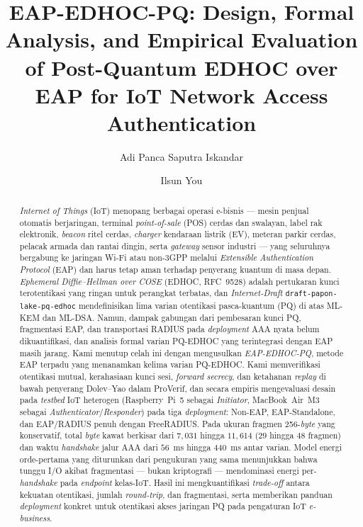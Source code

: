 \documentclass{easychair}
\title{EAP-EDHOC-PQ: Design, Formal Analysis, and Empirical Evaluation of Post-Quantum EDHOC over EAP for IoT Network Access Authentication}
\author{
Adi Panca Saputra Iskandar\inst{1,2}
\and
Ilsun You\inst{2}
}
\institute{
Kookmin University, Seoul, Korea\\
\email{adipancaiskandar@gmail.com, ilsunu@gmail.com}
\and
Udayana University, Bali, Indonesia\\
}
\begin{document}
\maketitle

\begin{abstract}
\emph{Internet of Things} (IoT) menopang berbagai operasi e-bisnis ---
mesin penjual otomatis berjaringan, terminal \emph{point-of-sale} (POS)
cerdas dan swalayan, label rak elektronik, \emph{beacon} ritel cerdas,
\emph{charger} kendaraan listrik (EV), meteran parkir cerdas, pelacak
armada dan rantai dingin, serta \emph{gateway} sensor industri ---
yang seluruhnya bergabung ke jaringan Wi-Fi atau non-3GPP melalui
\emph{Extensible Authentication Protocol} (EAP) dan harus tetap aman
terhadap penyerang kuantum di masa depan. \emph{Ephemeral
Diffie--Hellman over COSE} (EDHOC, RFC~9528) adalah pertukaran kunci
terotentikasi yang ringan untuk perangkat terbatas, dan
\emph{Internet-Draft} \texttt{draft-papon-lake-pq-edhoc}
mendefinisikan lima varian otentikasi pasca-kuantum (PQ) di atas
ML-KEM dan ML-DSA. Namun, dampak gabungan dari pembesaran kunci PQ,
fragmentasi EAP, dan transportasi RADIUS pada \emph{deployment} AAA
nyata belum dikuantifikasi, dan analisis formal varian PQ-EDHOC
yang terintegrasi dengan EAP masih jarang. Kami menutup celah ini
dengan mengusulkan \emph{EAP-EDHOC-PQ}, metode EAP terpadu yang
menanamkan kelima varian PQ-EDHOC. Kami memverifikasi otentikasi
mutual, kerahasiaan kunci sesi, \emph{forward secrecy}, dan
ketahanan \emph{replay} di bawah penyerang Dolev--Yao dalam
ProVerif, dan secara empiris mengevaluasi desain pada \emph{testbed}
IoT heterogen (Raspberry~Pi~5 sebagai \emph{Initiator}, MacBook~Air~M3
sebagai \emph{Authenticator}/\emph{Responder}) pada tiga
\emph{deployment}: Non-EAP, EAP-Standalone, dan EAP/RADIUS penuh
dengan FreeRADIUS. Pada ukuran fragmen 256-\emph{byte} yang
konservatif, total \emph{byte} kawat berkisar dari $7{,}031$ hingga
$11{,}614$ ($29$ hingga $48$ fragmen) dan waktu \emph{handshake}
jalur AAA dari $56$~ms hingga $440$~ms antar varian. Model energi
orde-pertama yang diturunkan dari pengukuran yang sama menunjukkan
bahwa tunggu I/O akibat fragmentasi --- bukan kriptografi ---
mendominasi energi per-\emph{handshake} pada \emph{endpoint}
kelas-IoT. Hasil ini mengkuantifikasi \emph{trade-off} antara
kekuatan otentikasi, jumlah \emph{round-trip}, dan fragmentasi,
serta memberikan panduan \emph{deployment} konkret untuk otentikasi
akses jaringan PQ pada pengaturan IoT \emph{e-business}.

\end{abstract}
\end{document}

